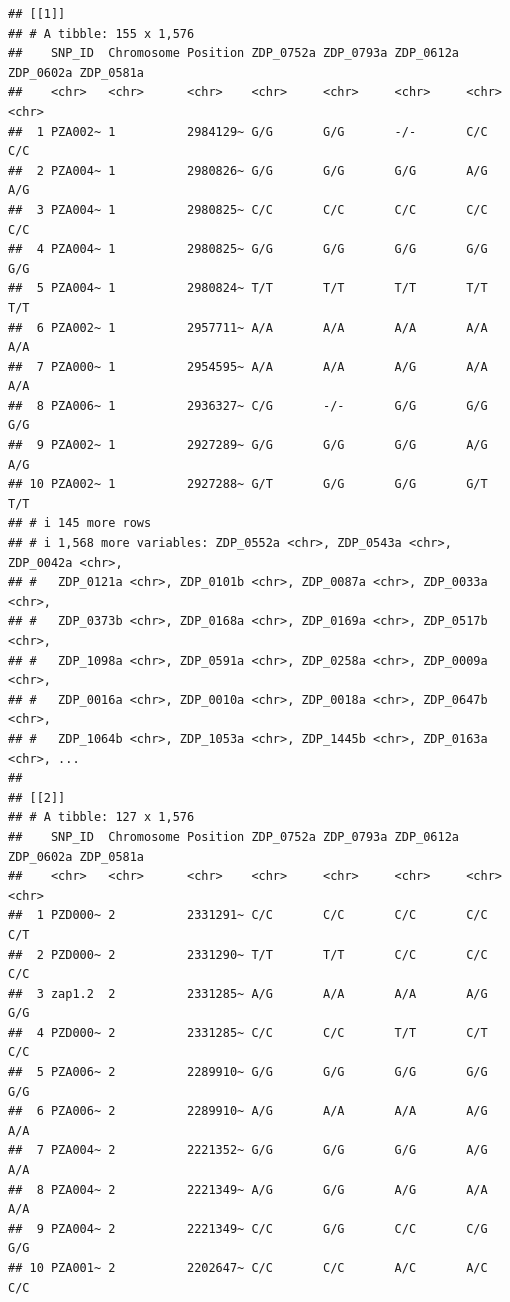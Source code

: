 \documentclass[
]{article}
\begin{document}
\begin{verbatim}
## [[1]]
## # A tibble: 155 x 1,576
##    SNP_ID  Chromosome Position ZDP_0752a ZDP_0793a ZDP_0612a ZDP_0602a ZDP_0581a
##    <chr>   <chr>      <chr>    <chr>     <chr>     <chr>     <chr>     <chr>    
##  1 PZA002~ 1          2984129~ G/G       G/G       -/-       C/C       C/C      
##  2 PZA004~ 1          2980826~ G/G       G/G       G/G       A/G       A/G      
##  3 PZA004~ 1          2980825~ C/C       C/C       C/C       C/C       C/C      
##  4 PZA004~ 1          2980825~ G/G       G/G       G/G       G/G       G/G      
##  5 PZA004~ 1          2980824~ T/T       T/T       T/T       T/T       T/T      
##  6 PZA002~ 1          2957711~ A/A       A/A       A/A       A/A       A/A      
##  7 PZA000~ 1          2954595~ A/A       A/A       A/G       A/A       A/A      
##  8 PZA006~ 1          2936327~ C/G       -/-       G/G       G/G       G/G      
##  9 PZA002~ 1          2927289~ G/G       G/G       G/G       A/G       A/G      
## 10 PZA002~ 1          2927288~ G/T       G/G       G/G       G/T       T/T      
## # i 145 more rows
## # i 1,568 more variables: ZDP_0552a <chr>, ZDP_0543a <chr>, ZDP_0042a <chr>,
## #   ZDP_0121a <chr>, ZDP_0101b <chr>, ZDP_0087a <chr>, ZDP_0033a <chr>,
## #   ZDP_0373b <chr>, ZDP_0168a <chr>, ZDP_0169a <chr>, ZDP_0517b <chr>,
## #   ZDP_1098a <chr>, ZDP_0591a <chr>, ZDP_0258a <chr>, ZDP_0009a <chr>,
## #   ZDP_0016a <chr>, ZDP_0010a <chr>, ZDP_0018a <chr>, ZDP_0647b <chr>,
## #   ZDP_1064b <chr>, ZDP_1053a <chr>, ZDP_1445b <chr>, ZDP_0163a <chr>, ...
## 
## [[2]]
## # A tibble: 127 x 1,576
##    SNP_ID  Chromosome Position ZDP_0752a ZDP_0793a ZDP_0612a ZDP_0602a ZDP_0581a
##    <chr>   <chr>      <chr>    <chr>     <chr>     <chr>     <chr>     <chr>    
##  1 PZD000~ 2          2331291~ C/C       C/C       C/C       C/C       C/T      
##  2 PZD000~ 2          2331290~ T/T       T/T       C/C       C/C       C/C      
##  3 zap1.2  2          2331285~ A/G       A/A       A/A       A/G       G/G      
##  4 PZD000~ 2          2331285~ C/C       C/C       T/T       C/T       C/C      
##  5 PZA006~ 2          2289910~ G/G       G/G       G/G       G/G       G/G      
##  6 PZA006~ 2          2289910~ A/G       A/A       A/A       A/G       A/A      
##  7 PZA004~ 2          2221352~ G/G       G/G       G/G       A/G       A/A      
##  8 PZA004~ 2          2221349~ A/G       G/G       A/G       A/A       A/A      
##  9 PZA004~ 2          2221349~ C/C       G/G       C/C       C/G       G/G      
## 10 PZA001~ 2          2202647~ C/C       C/C       A/C       A/C       C/C      

\end{verbatim}
\end{document}
